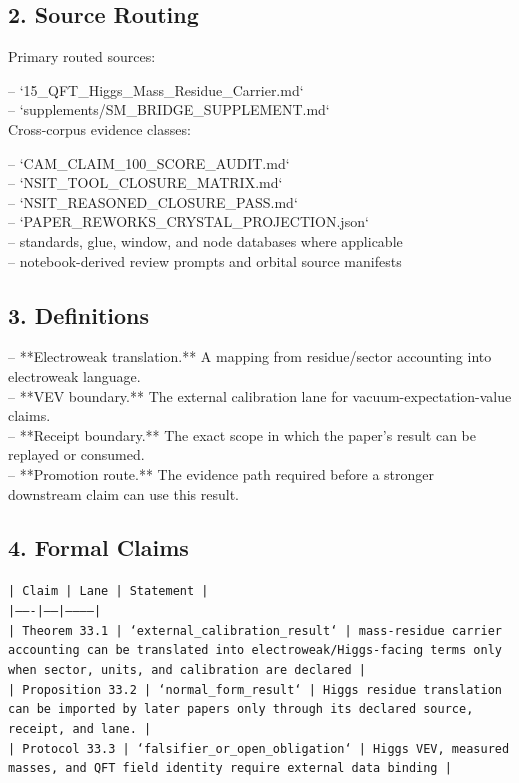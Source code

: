 \documentclass[11pt]{article}
\begin{document}
\subsection*{2. Source Routing}

Primary routed sources:

\noindent{}-- `15\_QFT\_Higgs\_Mass\_Residue\_Carrier.md`\\
\noindent{}-- `supplements/SM\_BRIDGE\_SUPPLEMENT.md`\\

Cross-corpus evidence classes:

\noindent{}-- `CAM\_CLAIM\_100\_SCORE\_AUDIT.md`\\
\noindent{}-- `NSIT\_TOOL\_CLOSURE\_MATRIX.md`\\
\noindent{}-- `NSIT\_REASONED\_CLOSURE\_PASS.md`\\
\noindent{}-- `PAPER\_REWORKS\_CRYSTAL\_PROJECTION.json`\\
\noindent{}-- standards, glue, window, and node databases where applicable\\
\noindent{}-- notebook-derived review prompts and orbital source manifests\\

\subsection*{3. Definitions}

\noindent{}-- **Electroweak translation.** A mapping from residue/sector accounting into electroweak language.\\
\noindent{}-- **VEV boundary.** The external calibration lane for vacuum-expectation-value claims.\\
\noindent{}-- **Receipt boundary.** The exact scope in which the paper's result can be replayed or consumed.\\
\noindent{}-- **Promotion route.** The evidence path required before a stronger downstream claim can use this result.\\

\subsection*{4. Formal Claims}

\noindent\texttt{| Claim | Lane | Statement |}\\
\noindent\texttt{|-------|------|-----------|}\\
\noindent\texttt{| Theorem 33.1 | `external\_calibration\_result` | mass-residue carrier accounting can be translated into electroweak/Higgs-facing terms only when sector, units, and calibration are declared |}\\
\noindent\texttt{| Proposition 33.2 | `normal\_form\_result` | Higgs residue translation can be imported by later papers only through its declared source, receipt, and lane. |}\\
\noindent\texttt{| Protocol 33.3 | `falsifier\_or\_open\_obligation` | Higgs VEV, measured masses, and QFT field identity require external data binding |}\\
\end{document}
